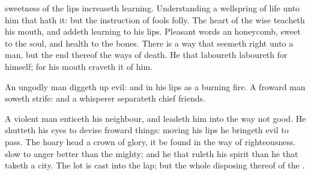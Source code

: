 {sweetness of the
lips
increaseth
learning.
Understanding
{} a
wellspring of
life unto him that
hath it: but the
instruction of
fools
{}
folly.
The
heart of the
wise
teacheth his
mouth, and
addeth
learning to his
lips.
Pleasant
words
{} an
honeycomb,
sweet to the
soul, and
health to the
bones.
There
is a
way that seemeth
right
unto a
man, but the
end thereof
{} the
ways of
death.
He that
laboureth
laboureth for himself; for his
mouth
craveth it of him.
\par }{\PP {}An
ungodly
man diggeth
up
evil: and in his
lips
{} as a
burning
fire.
A
froward
man
soweth
strife: and a
whisperer
separateth chief
friends.
\par }{\PP {}A
violent
man
enticeth his
neighbour, and
leadeth him into the
way
{} not
good.
He
shutteth his
eyes to
devise froward
things:
moving his
lips he
bringeth
evil to
pass.
The hoary
head
{} a
crown of
glory,
{} it be
found in the
way of
righteousness.
slow to
anger
{}
better than the
mighty; and he that
ruleth his
spirit than he that
taketh a
city.
The
lot is
cast into the
lap; but the whole
disposing thereof
{} of the
{}.

}
